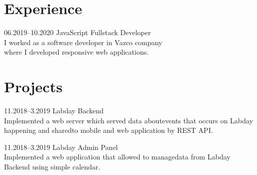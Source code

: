 \documentclass[]{cv-style}
\begin{document}

\section{Experience}

\begin{entrylist}
\entry
  { 06.2019--10.2020}
  { JavaScript Fullstack Developer}
  {}
  {\\
  I worked as a software developer in Vazco company\\ where I developed responsive web applications.}
\end{entrylist}

\section{Projects}

\begin{entrylist}
\entry
  {11.2018--3.2019}
  { Labday Backend}
  {}
  {\\
  Implemented a web server which served data about\newline events that occurs on Labday happening and shared\newline to mobile and web application by REST API.\newline}


\entry
  {11.2018--3.2019}
  { Labday Admin Panel}
  {}
  {\\
  Implemented a web application that allowed to manage\newline data from Labday Backend using simple calendar.\newline}
  {\vspace{-0.3cm}}
\end{entrylist}
\end{document}
